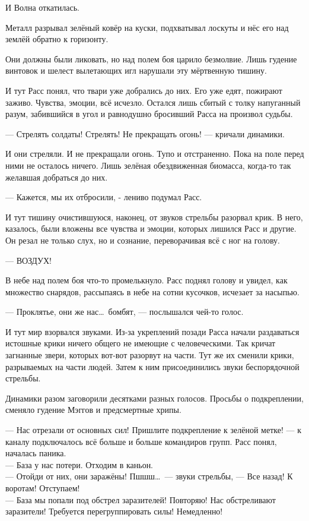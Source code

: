 И Волна откатилась.

Металл разрывал зелёный ковёр на куски, подхватывал лоскуты и нёс его над землёй 
обратно к горизонту.

Они должны были ликовать, но над полем боя царило безмолвие. Лишь гудение 
винтовок и шелест вылетающих игл нарушали эту мёртвенную тишину.

И тут Расс понял, что твари уже добрались до них. Его уже едят, пожирают заживо. 
Чувства, эмоции, всё исчезло. Остался лишь сбитый с толку напуганный разум, 
забившийся в угол и равнодушно бросивший Расса на произвол судьбы.

\noindent --- Стрелять солдаты! Стрелять! Не прекращать огонь! --- кричали 
динамики.

И они стреляли. И не прекращали огонь. Тупо и отстраненно. Пока на поле перед 
ними не осталось ничего. Лишь зелёная обездвиженная биомасса, когда-то так 
желавшая добраться до них.

\noindent--- Кажется, мы их отбросили, - лениво подумал Расс.

И тут тишину очистившуюся, наконец, от звуков стрельбы разорвал крик. В него, 
казалось, были вложены все чувства и эмоции, которых лишился Расс и другие. Он 
резал не только слух, но и сознание, переворачивая всё с ног на голову.

\noindent--- ВОЗДУХ!

В небе над полем боя что-то промелькнуло. Расс поднял голову и увидел, как 
множество снарядов, рассыпаясь в небе на сотни кусочков, исчезает за насыпью.

\noindent --- Проклятье, они же нас\ldots\ бомбят, --- послышался чей-то голос.

И тут мир взорвался звуками. Из-за укреплений позади Расса начали раздаваться 
истошные крики ничего общего не имеющие с человеческими. Так кричат загнанные 
звери, которых вот-вот разорвут на части. Тут же их сменили крики, разрываемых 
на части людей. Затем к ним присоединились звуки беспорядочной стрельбы.

Динамики разом заговорили десятками разных голосов. Просьбы о подкреплении, 
сменяло гудение Мэггов и предсмертные хрипы.

\noindent --- Нас отрезали от основных сил! Пришлите подкрепление к зелёной 
метке! --- к каналу подключалось всё больше и больше командиров групп. Расс 
понял, началась паника.\\
--- База у нас потери. Отходим в каньон.\\
--- Отойди от них, они заражёны! Пшшш\ldots\ --- звуки стрельбы, --- Все назад! 
К воротам! Отступаем!\\
--- База мы попали под обстрел заразителей! Повторяю! Нас обстреливают 
заразители! Требуется перегруппировать силы! Немедленно!

